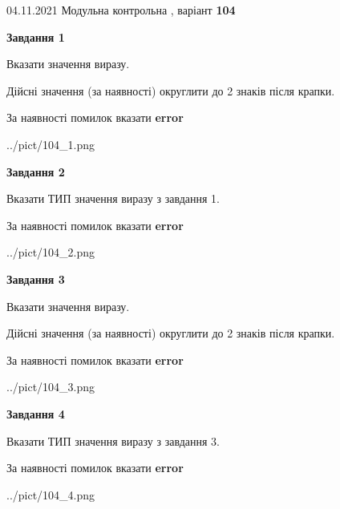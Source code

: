 \documentclass[11pt, ukrainian]{article}
\begin{document}
{04.11.2021 Модульна контрольна , варіант  \No \textbf { 104 }\par}
{
\begin {large}
{\begin {center}\textbf{Завдання 1}\end {center}}\par
Вказати значення виразу. \par
Дійсні значення (за наявності) округлити до 2 знаків після крапки. \par
За наявності помилок вказати \textbf{error}

\begin{center}
	{../pict/104_1.png}
\end{center}
\newpage

{\begin {center}\textbf{Завдання 2}\end {center}}\par
Вказати ТИП значення виразу з завдання 1. \par
За наявності помилок вказати \textbf{error}

\begin{center}
	{../pict/104_2.png}
\end{center}
\newpage

{\begin {center}\textbf{Завдання 3}\end {center}}\par
Вказати значення виразу. \par
Дійсні значення (за наявності) округлити до 2 знаків після крапки. \par
За наявності помилок вказати \textbf{error}

\begin{center}
	{../pict/104_3.png}
\end{center}
\newpage

{\begin {center}\textbf{Завдання 4}\end {center}}\par
Вказати ТИП значення виразу з завдання 3. \par
За наявності помилок вказати \textbf{error}

\begin{center}
	{../pict/104_4.png}
\end{center}
\newpage


\end{large}}
\end{document}
